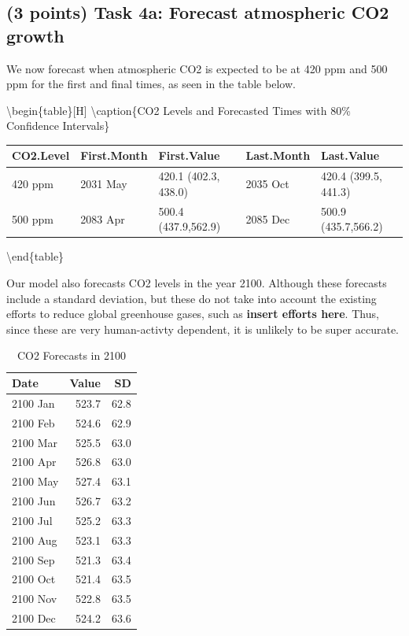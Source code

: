 \documentclass[
]{article}
\begin{document}
\subsection{(3 points) Task 4a: Forecast atmospheric CO2 growth}\label{points-task-4a-forecast-atmospheric-co2-growth}

We now forecast when atmospheric CO2 is expected to be at 420 ppm and 500 ppm for the first and final times, as seen in the table below.

\textbackslash begin\{table\}{[}H{]}
\centering
\textbackslash caption\{\label{tab:forecastone}CO2 Levels and Forecasted Times with 80\% Confidence Intervals\}
\centering
\fontsize{9}{11}\selectfont

\begin{tabular}[t]{l|l|l|l|l}
\hline
CO2.Level & First.Month & First.Value & Last.Month & Last.Value\\
\hline
420 ppm & 2031 May & 420.1 (402.3, 438.0) & 2035 Oct & 420.4 (399.5, 441.3)\\
\hline
500 ppm & 2083 Apr & 500.4 (437.9,562.9) & 2085 Dec & 500.9 (435.7,566.2)\\
\hline
\end{tabular}

\textbackslash end\{table\}

Our model also forecasts CO2 levels in the year 2100. Although these forecasts include a standard deviation, but these do not take into account the existing efforts to reduce global greenhouse gases, such as \textbf{insert efforts here}. Thus, since these are very human-activty dependent, it is unlikely to be super accurate.

\begin{table}[H]
\centering
\caption{\label{tab:forecasttwo}CO2 Forecasts in 2100}
\centering
\fontsize{9}{11}\selectfont
\begin{tabular}[t]{l|r|r}
\hline
Date & Value & SD\\
\hline
2100 Jan & 523.7 & 62.8\\
\hline
2100 Feb & 524.6 & 62.9\\
\hline
2100 Mar & 525.5 & 63.0\\
\hline
2100 Apr & 526.8 & 63.0\\
\hline
2100 May & 527.4 & 63.1\\
\hline
2100 Jun & 526.7 & 63.2\\
\hline
2100 Jul & 525.2 & 63.3\\
\hline
2100 Aug & 523.1 & 63.3\\
\hline
2100 Sep & 521.3 & 63.4\\
\hline
2100 Oct & 521.4 & 63.5\\
\hline
2100 Nov & 522.8 & 63.5\\
\hline
2100 Dec & 524.2 & 63.6\\
\hline
\end{tabular}
\end{table}
\end{document}
